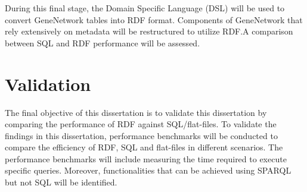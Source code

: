 During this final stage, the Domain Specific Language (DSL) will be used to convert GeneNetwork tables into RDF format.  Components of GeneNetwork that rely extensively on metadata will be restructured to utilize RDF.\@  A comparison between SQL and RDF performance will be assessed.

\section{Validation}

The final objective of this dissertation is to validate this dissertation by comparing the performance of RDF against SQL/flat-files.  To validate the findings in this dissertation, performance benchmarks will be conducted to compare the efficiency of RDF, SQL and flat-files in different scenarios.  The performance benchmarks will include measuring the time required to execute specific queries.  Moreover, functionalities that can be achieved using SPARQL but not SQL will be identified.

